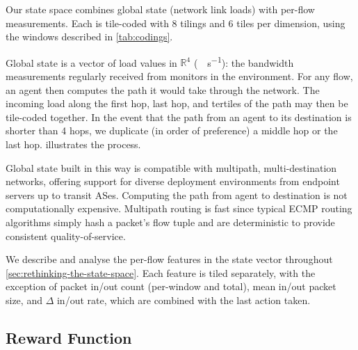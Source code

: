 \documentclass[10pt, times, conference, letterpaper]{IEEEtran}
\begin{document}
Our state space combines global state (network link loads) with per-flow measurements.
Each is tile-coded with 8 tilings and 6 tiles per dimension, using the windows described in \cref{tab:codings}.

Global state is a vector of load values in $\mathbb{R}^4$ (\si{\mega\bit\per\second}): the bandwidth measurements regularly received from monitors in the environment.
For any flow, an agent then computes the path it would take through the network.
The incoming load along the first hop, last hop, and tertiles of the path may then be tile-coded together.
In the event that the path from an agent to its destination is shorter than 4 hops, we duplicate (in order of preference) a middle hop or the last hop.
 illustrates the process.

Global state built in this way is compatible with multipath, multi-destination networks, offering support for diverse deployment environments from endpoint servers up to transit ASes.
Computing the path from agent to destination is not computationally expensive.
Multipath routing is fast since typical ECMP routing algorithms simply hash a packet's flow tuple and are deterministic to provide consistent quality-of-service.


We describe and analyse the per-flow features in the state vector throughout \cref{sec:rethinking-the-state-space}.
Each feature is tiled separately, with the exception of packet in/out count (per-window and total), mean in/out packet size, and $\Delta$ in/out rate, which are combined with the last action taken.

\subsection{Reward Function}

%
\end{document}
